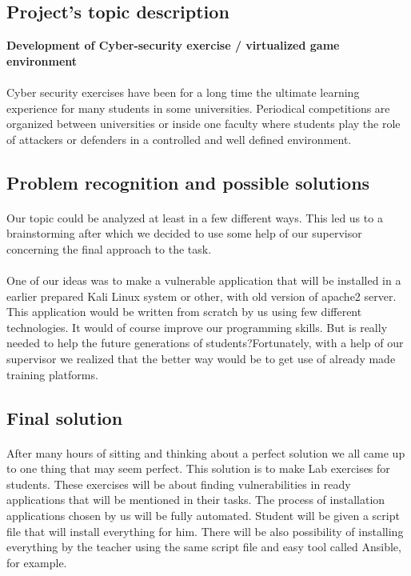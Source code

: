 \documentclass[12pt, a4paper]{article}
\begin{document}
\subsection{Project's topic description}
\textbf{Development of Cyber-security exercise / virtualized game environment}
\paragraph{}Cyber security exercises have been for a long time the ultimate learning experience for many students in some universities. Periodical competitions are organized between universities or inside one faculty where students play the role of attackers or defenders in a controlled and well defined environment.

\subsection{Problem recognition and possible solutions}
\paragraph{}Our topic could be analyzed at least in a few different ways. This led us to a brainstorming after which we decided to use some help of our supervisor concerning the final approach to the task.

\paragraph{}One of our ideas was to make a vulnerable application that will be installed in a earlier prepared Kali Linux system or other, with old version of apache2 server. This application would be written from scratch by us using few different technologies. It would of course improve our programming skills. But is really needed to help the future generations of students?Fortunately, with a help of our supervisor we realized that the better way would be to get use of already made training platforms.

\subsection{Final solution}
\paragraph{}After many hours of sitting and thinking about a perfect solution we all came up to one thing that may seem perfect. This solution is to make Lab exercises for students. These exercises will be about finding vulnerabilities in ready applications that will be mentioned in their tasks. The process of installation applications chosen by us will be fully automated. Student will be given a script file that will install everything for him. There will be also possibility of installing everything by the teacher using the same script file and easy tool called Ansible, for example.
\end{document}
